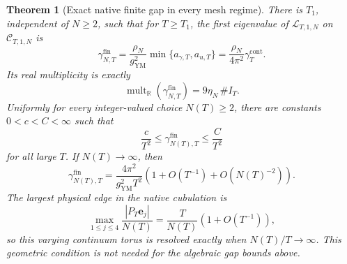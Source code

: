 \documentclass[11pt]{article}
\newtheorem{theorem}{Theorem}[section]
\theoremstyle{definition}
\numberwithin{equation}{section}
\begin{document}
\begin{theorem}[Exact native finite gap in every mesh regime]
\label{cusp-link-native-finite-gap}
There is \(T_1\), independent of \(N\ge2\), such that for \(T\ge T_1\),
the first eigenvalue of
\(\mathcal L_{T,1,N}\) on \(\mathscr C_{T,1,N}\) is
\begin{equation}
 \gamma_{N,T}^{\mathrm{fin}}
 =\frac{\rho_N}{g_{\mathrm{YM}}^2}
   \min\{a_{\gamma,T},a_{u,T}\}
 =\frac{\rho_N}{4\pi^2}\gamma_T^{\mathrm{cont}}.
 \label{cusp-link-native-finite-gap-exact}
\end{equation}
Its real multiplicity is exactly
\begin{equation}
 \operatorname{mult}_{\mathbb R}(\gamma_{N,T}^{\mathrm{fin}})
 =9\eta_N\,\#I_T.
 \label{cusp-link-native-finite-gap-multiplicity}
\end{equation}
Uniformly for every integer-valued choice \(N(T)\ge2\), there are constants
\(0<c<C<\infty\) such that
\begin{equation}
 \frac{c}{T^2}\le\gamma_{N(T),T}^{\mathrm{fin}}
 \le\frac{C}{T^2}
 \label{cusp-link-native-finite-gap-uniform}
\end{equation}
for all large \(T\).  If \(N(T)\to\infty\), then
\begin{equation}
 \gamma_{N(T),T}^{\mathrm{fin}}
 =\frac{4\pi^2}{g_{\mathrm{YM}}^2T^2}
   \left(1+O(T^{-1})+O(N(T)^{-2})\right).
 \label{cusp-link-native-finite-gap-refined}
\end{equation}
The largest physical edge in the native cubulation is
\begin{equation}
 \max_{1\le j\le4}\frac{|P_T\mathbf e_j|}{N(T)}
 =\frac{T}{N(T)}(1+O(T^{-1})),
 \label{cusp-link-native-mesh-size}
\end{equation}
so this varying continuum torus is resolved exactly when
\(N(T)/T\to\infty\).  This geometric condition is not needed for the
algebraic gap bounds above.
\end{theorem}
\end{document}
